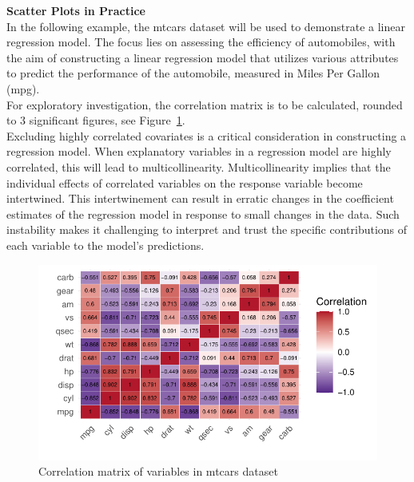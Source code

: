 \documentclass{article}\usepackage[]{graphicx}\usepackage[]{xcolor}
\makeatletter
\def\maxwidth{ %
  \ifdim\Gin@nat@width>\linewidth
    \linewidth
  \else
    \Gin@nat@width
  \fi
}
\newenvironment{knitrout}{}{} %
\makeatother
\begin{document}
\noident 
\textbf{Scatter Plots in Practice}\\

\noindent
In the following example, the mtcars dataset will be used to demonstrate a linear regression model. The focus lies on assessing the efficiency of automobiles, with the aim of constructing a linear regression model that utilizes various attributes to predict the performance of the automobile, measured in Miles Per Gallon (mpg).\\

\noindent
For exploratory investigation, the correlation matrix is to be calculated, rounded to 3 significant figures, see Figure~\ref{fig:cor-matrix-mtcars2}.\\

\noindent
Excluding highly correlated covariates is a critical consideration in constructing a regression model. When explanatory variables in a regression model are highly correlated, this will lead to multicollinearity. Multicollinearity implies that the individual effects of correlated variables on the response variable become intertwined. This intertwinement can result in erratic changes in the coefficient estimates of the regression model in response to small changes in the data. Such instability makes it challenging to interpret and trust the specific contributions of each variable to the model's predictions\cite{multicoli}.\\


\begin{knitrout}\scriptsize
{}\color{fgcolor}\begin{figure}[H]

{\centering \includegraphics[width=\maxwidth]{figure/beamer-cor-matrix-mtcars2-1} 

}

\caption[Correlation matrix of variables in mtcars dataset]{Correlation matrix of variables in mtcars dataset}\label{fig:cor-matrix-mtcars2}
\end{figure}

\end{knitrout}
\end{document}
